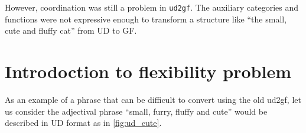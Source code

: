 
However, coordination was still a problem in \verb|ud2gf|. The auxiliary categories and functions were not expressive enough to transform a structure like ``the small, cute and fluffy cat'' from UD to GF.

\FloatBarrier

\section{Introdoction to flexibility problem}

As an example of a phrase that can be difficult to convert using the old ud2gf, let us consider the adjectival phrase ``small, furry, fluffy and cute''
would be described in UD format as in \autoref{fig:ud_cute}.




